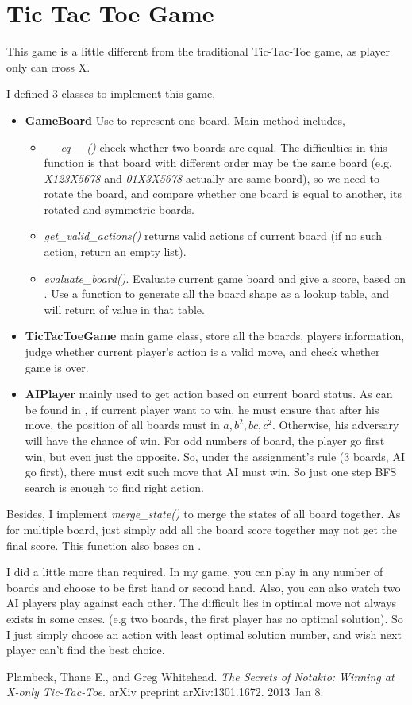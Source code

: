 \documentclass{article}
\begin{document}
	\section{Tic Tac Toe Game}
	\label{sec:Q6}
	This game is a little different from the traditional Tic-Tac-Toe game, as player only can cross X.\par
	I defined 3 classes to implement this game,
	\begin{itemize}
		\item \textbf{GameBoard} Use to represent one board. Main method includes, 
		\begin{itemize}
			\item \textit{\_\_eq\_\_()} check whether two boards are equal. The difficulties in this function is that board with different order may be the same board (e.g. \textit{X123X5678} and \textit{01X3X5678} actually are same board), so we need to rotate the board, and compare whether one board is equal to another, its rotated and symmetric boards.
			\item \textit{get\_valid\_actions()} returns valid actions of current board (if no such action, return an empty list).
			\item \textit{evaluate\_board()}. Evaluate current game board and give a score, based on \cite{winning_strategy}. Use a function to generate all the board shape as a lookup table, and will return of value in that table.
		\end{itemize}
		\item \textbf{TicTacToeGame} main game class, store all the boards, players information, judge whether current player's action is a valid move, and check whether game is over.
		\item \textbf{AIPlayer} mainly used to get action based on current board status. As can be found in \cite{winning_strategy}, if current player want to win, he must ensure that after his move, the position of all boards must in $ {a,b^2,bc,c^2} $. Otherwise, his adversary will have the chance of win. For odd numbers of board, the player go first win, but even just the opposite. So, under the assignment's rule (3 boards, AI go first), there must exit such move that AI must win. So just one step BFS search is enough to find right action.
	\end{itemize}
	Besides, I implement \textit{merge\_state()} to merge the states of all board together. As for multiple board, just simply add all the board score together may not get the final score. This function also bases on \cite{winning_strategy}.\par 
	I did a little more than required. In my game, you can play in any number of boards and choose to be first hand or second hand. Also, you can also watch two AI players play against each other. The difficult lies in optimal move not always exists in some cases. (e.g two boards, the first player has no optimal solution). So I just simply choose an action with least optimal solution number, and wish next player can't find the best choice.
	\begin{thebibliography}{1}
		Plambeck, Thane E., and Greg Whitehead. 
		\textit{The Secrets of Notakto: Winning at X-only Tic-Tac-Toe}. 
		arXiv preprint arXiv:1301.1672. 2013 Jan 8.
	\end{thebibliography}
\end{document}
